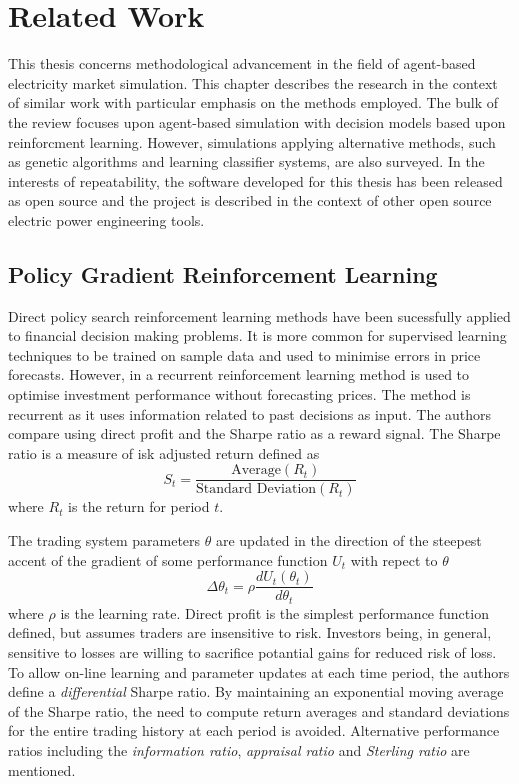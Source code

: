 \chapter{Related Work}
\label{ch:related_work}
This thesis concerns methodological advancement in the field of agent-based
electricity market simulation.  This chapter describes the research in the
context of similar work with particular emphasis on the methods employed.  The
bulk of the review focuses upon agent-based simulation with decision models
based upon reinforcment learning.  However, simulations applying alternative
methods, such as genetic algorithms and learning classifier systems, are also
surveyed.  In the interests of repeatability, the software developed for
this thesis has been released as open source and the project is described in
the context of other open source electric power engineering tools.

\section{Policy Gradient Reinforcement Learning}
Direct policy search reinforcement learning methods have been sucessfully
applied to financial decision making problems.  It is more common for
supervised learning techniques to be trained on sample data and used to
minimise errors in price forecasts.  However, in \cite{moody:98} a recurrent
reinforcement learning method is used to optimise investment performance
without forecasting prices.  The method is recurrent as it uses information
related to past decisions as input.  The authors compare using direct profit
and the Sharpe ratio \cite{sharpe:ratio66,sharpe:ratio94} as a reward signal.
The Sharpe ratio is a measure of isk adjusted return defined as
\begin{equation}
S_t = \frac{\mbox{Average}(R_t)}{\mbox{Standard Deviation}(R_t)}
\end{equation}
where $R_t$ is the return for period $t$.

The trading system parameters $\theta$ are updated in the direction of the
steepest accent of the gradient of some performance function $U_t$ with repect
to $\theta$
\begin{equation}
\Delta\theta_t = \rho \frac{dU_t(\theta_t)}{d\theta_t}
\end{equation}
where $\rho$ is the learning rate.  Direct profit is the simplest performance
function defined, but assumes traders are insensitive to risk.  Investors
being, in general, sensitive to losses are willing to sacrifice potantial gains
for reduced risk of loss.
To allow on-line learning and parameter updates at each time period, the
authors define a \textit{differential} Sharpe ratio.  By maintaining an
exponential moving average of the Sharpe ratio, the need to compute return
averages and standard deviations for the entire trading history at each period
is avoided.  Alternative performance ratios including the \textit{information
ratio}, \textit{appraisal ratio} and \textit{Sterling ratio} are mentioned.

